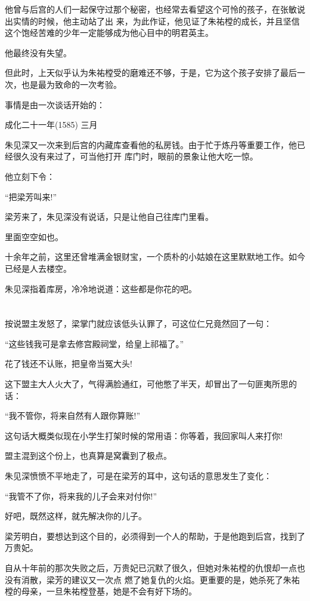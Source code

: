 \documentclass[11pt,a4paper,onecolumn]{article}
\begin{document}
他曾与后宫的人们一起保守过那个秘密，也经常去看望这个可怜的孩子，在张敏说出实情的时候，他主动站了出
来，为此作证，他见证了朱祐樘的成长，并且坚信这个饱经苦难的少年一定能够成为他心目中的明君英主。

他最终没有失望。

但此时，上天似乎认为朱祐樘受的磨难还不够，于是，它为这个孩子安排了最后一次，也是最为致命的一次考验。

事情是由一次谈话开始的：

成化二十一年(1585) 三月

朱见深又一次来到后宫的内藏库查看他的私房钱。由于忙于炼丹等重要工作，他已经很久没有来过了，可当他打开
库门时，眼前的景象让他大吃一惊。

他立刻下令：

``把梁芳叫来!''

梁芳来了，朱见深没有说话，只是让他自己往库门里看。

里面空空如也。

十余年之前，这里还曾堆满金银财宝，一个质朴的小姑娘在这里默默地工作。如今已经是人去楼空。

朱见深指着库房，冷冷地说道：这些都是你花的吧。

\section[\thesection]{}

按说盟主发怒了，梁掌门就应该低头认罪了，可这位仁兄竟然回了一句：

``这些钱我可是拿去修宫殿祠堂，给皇上祁福了。''

花了钱还不认账，把皇帝当冤大头!

这下盟主大人火大了，气得满脸通红，可他憋了半天，却冒出了一句匪夷所思的话：

``我不管你，将来自然有人跟你算账!''

这句话大概类似现在小学生打架时候的常用语：你等着，我回家叫人来打你!

盟主混到这个份上，也真算是窝囊到了极点。

朱见深愤愤不平地走了，可是在梁芳的耳中，这句话的意思发生了变化：

``我管不了你，将来我的儿子会来对付你!''

好吧，既然这样，就先解决你的儿子。

梁芳明白，要想达到这个目的，必须得到一个人的帮助，于是他跑到后宫，找到了万贵妃。

自从十年前的那次失败之后，万贵妃已沉默了很久，但她对朱祐樘的仇恨却一点也没有消散，梁芳的建议又一次点
燃了她复仇的火焰。更重要的是，她杀死了朱祐樘的母亲，一旦朱祐樘登基，她是不会有好下场的。
\end{document}
